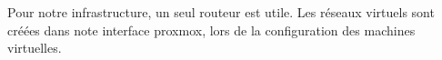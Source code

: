 \documentclass[../livrable-4.tex]{subfiles}
\begin{document}
Pour notre infrastructure, un seul routeur est utile. Les réseaux virtuels sont créées 
dans note interface proxmox, lors de la configuration des machines virtuelles.

\UseRawInputEncoding

\end{document}
